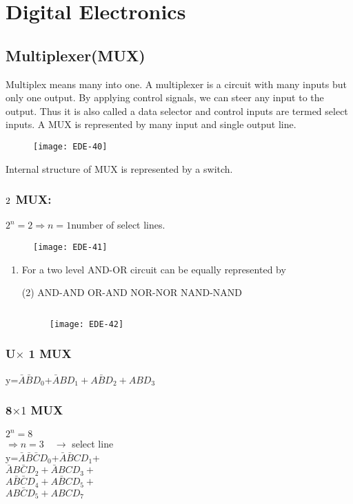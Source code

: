 \chapter{Digital Electronics}
\section{Multiplexer(MUX)}
Multiplex means many into one. A multiplexer is a circuit with many inputs but only one output. By applying control signals, we can steer any input to the output. Thus it is also called a data selector and control inputs are termed select inputs. A MUX is represented by many input and single output line.
\begin{figure}[H]
	\centering
	\texttt{[image: EDE-40]}
\end{figure}
Internal structure of MUX is represented by a switch.
\subsection{{$2\time 1$ MUX:}}
$2^n=2\Rightarrow n=1$\quad number of select lines.
\begin{figure}[H]
	\centering
	\texttt{[image: EDE-41]}
\end{figure}
\begin{enumerate}
	\item For a two level AND-OR circuit can be equally represented by
	\begin{tasks}(2)
		\task[\textbf{a.}]AND-AND
		\task[\textbf{b.}]OR-AND
		\task[\textbf{c.}]NOR-NOR
		\task[\textbf{d.}] NAND-NAND
	\end{tasks}
	\begin{answer}$\left. \right. $\\
		\begin{figure}[H]
			\centering
			\texttt{[image: EDE-42]}
		\end{figure}
	\end{answer}
\end{enumerate}
\subsection{U$\times$ 1 MUX}
y=$\bar{A}\bar{B}D_0$+$\bar{A}BD_1+A\bar{B}D_2+ABD_3$
\subsection{8$\times 1$ MUX}
$	2^n=8$\\
$\Rightarrow n=3\quad\rightarrow$ select line\\
y=$\bar{A}\bar{B} \bar{C}D_0$+$\bar{A}\bar{B} CD_1$+\\
$\bar{A}B\bar{C}D_2+\bar{A}BCD_3+$\\
$A \bar{B}\bar{C}D_4+A\bar{B}CD_5+$\\
$AB\bar{C}D_5+ABCD_7$
